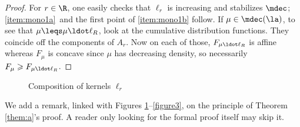 \begin{proof} For $r\in \R$, one easily checks that $\ell_r$ is increasing and stabilizes $\mdec$; \eqref{item:mono1a}~and the first point of \eqref{item:mono1b} follow. If $\mu\in \mdec(\la)$, to see that $\mu\leqs \mu\ldot\ell_R$, look at the cumulative distribution functions. They coincide off the components of $A_r$. Now on each of those, $F_{\mu\ldot\ell_R}$ is affine whereas $F_\mu$ is concave since $\mu$ has decreasing density, so necessarily $F_\mu\geqslant F_{\mu\ldot\ell_R}$.
\end{proof}

\begin{figure}
\begin{center}
\def\svgwidth{{.7\columnwidth}}

\caption{Composition of kernels $\ell_r$}\label{figure}
\end{center}
\end{figure}

We add a remark, linked with Figures \ref{figure}--\ref{figure3}, on the principle of Theorem \ref{them:a}'s proof. A reader only looking for the formal proof itself may skip it.


